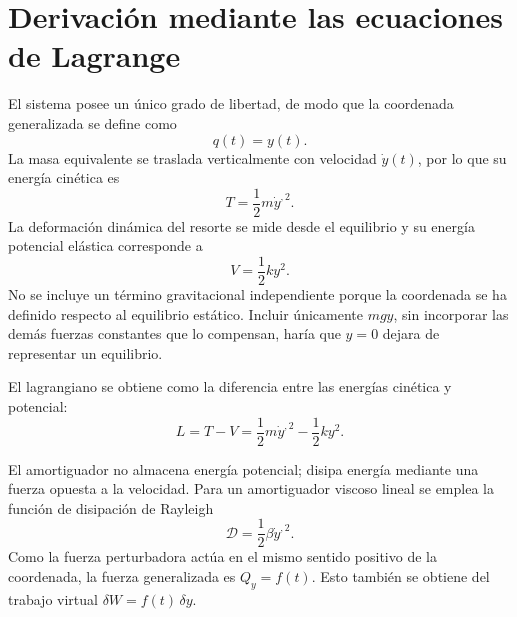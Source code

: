 \section{Derivación mediante las ecuaciones de Lagrange}

El sistema posee un único grado de libertad, de modo que la coordenada generalizada se define como
\begin{equation}
  q(t)=y(t).
\end{equation}
La masa equivalente se traslada verticalmente con velocidad $\dot y(t)$, por lo que su energía cinética es
\begin{equation}
  T=\frac{1}{2}m\dot y^{,2}.
  \label{eq:cinetica}
\end{equation}
La deformación dinámica del resorte se mide desde el equilibrio y su energía potencial elástica corresponde a
\begin{equation}
  V=\frac{1}{2}ky^2.
  \label{eq:potencial}
\end{equation}
No se incluye un término gravitacional independiente porque la coordenada se ha definido respecto al equilibrio estático. Incluir únicamente $mgy$, sin incorporar las demás fuerzas constantes que lo compensan, haría que $y=0$ dejara de representar un equilibrio.

El lagrangiano se obtiene como la diferencia entre las energías cinética y potencial:
\begin{equation}
  L=T-V=\frac{1}{2}m\dot y^{,2}-\frac{1}{2}ky^2.
  \label{eq:lagrangiano}
\end{equation}

El amortiguador no almacena energía potencial; disipa energía mediante una fuerza opuesta a la velocidad. Para un amortiguador viscoso lineal se emplea la función de disipación de Rayleigh
\begin{equation}
  \mathcal{D}=\frac{1}{2}\beta\dot y^{,2}.
  \label{eq:rayleigh}
\end{equation}
Como la fuerza perturbadora actúa en el mismo sentido positivo de la coordenada, la fuerza generalizada es $Q_y=f(t)$. Esto también se obtiene del trabajo virtual $\delta W=f(t)\,\delta y$.

